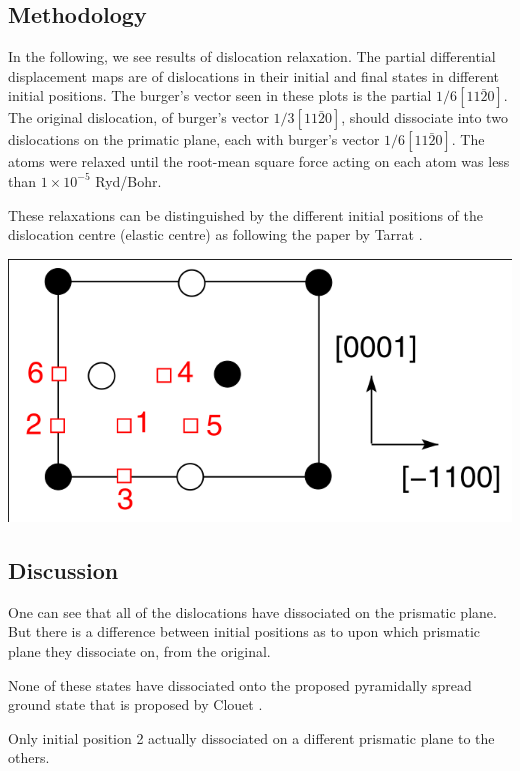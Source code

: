 \documentclass[11pt]{article}
\begin{document}
\subsection{Methodology}
\label{sec:org22d9b5a}
In the following, we see results of dislocation relaxation. The partial differential
displacement maps are of dislocations in their initial and final states in different initial
positions. The burger's vector seen in these plots is the partial \(1/6 [11\bar{2}0]\). The
original dislocation, of burger's vector \(1/3 [11\bar{2}0]\), should dissociate into two
dislocations on the primatic plane, each with burger's vector \(1/6 [11\bar{2}0]\). The atoms were
relaxed until the root-mean square force acting on each atom was less than \(1\times 10^{-5}\)
Ryd/Bohr.

These relaxations can be distinguished by the different initial
positions of the dislocation centre (elastic centre) as following
the paper by Tarrat \cite{Tarrat2009}.

\begin{center}
\includegraphics[width=.9\linewidth]{Images/tarrat_hcp_core_structures.png}
\end{center}

\subsection{Discussion}
\label{sec:orgcc81f62}
One can see that all of the dislocations have dissociated on the
prismatic plane. But there is a difference between initial
positions as to upon which prismatic plane they dissociate on,
from the original. 

None of these states have dissociated onto the proposed pyramidally spread ground state that is
proposed by Clouet \cite{Clouet2015}.

Only initial position 2 actually dissociated on a different
prismatic plane to the others. 
\end{document}
